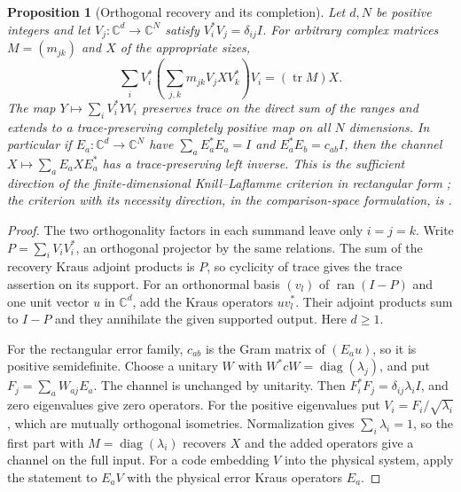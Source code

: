 \documentclass[11pt,reqno]{amsart}
\newtheorem{proposition}[theorem]{Proposition}
\theoremstyle{definition}
\theoremstyle{remark}
\numberwithin{equation}{section}
\newcommand{\C}{\mathbb{C}}
\begin{document}
\begin{proposition}[Orthogonal recovery and its completion]\label{m7:recovery}
Let $d,N$ be positive integers and let $V_j:\C^d\to\C^N$ satisfy $V_i^*V_j=\delta_{ij}I$.
For arbitrary complex matrices $M=(m_{jk})$ and $X$ of the
appropriate sizes,
\[
 \sum_i V_i^*\left(\sum_{j,k}m_{jk}V_j X V_k^*\right)V_i
    =(\operatorname{tr}M)X .
\]
The map $Y\mapsto\sum_iV_i^*YV_i$ preserves trace on the direct sum
of the ranges and extends to a trace-preserving completely positive
map on all $N$ dimensions. In particular if
$E_a:\C^d\to\C^N$ have $\sum_aE_a^*E_a=I$ and
$E_a^*E_b=c_{ab}I$, then the channel
$X\mapsto\sum_aE_a X E_a^*$ has a trace-preserving left inverse.
This is the sufficient direction of the finite-dimensional
Knill--Laflamme criterion in rectangular form
\cite{m7:KL,m7:Gottesman}; the criterion with its necessity direction, in the comparison-space formulation, is
\cite[Thm.~122]{Companion}.
\end{proposition}
\begin{proof}
The two orthogonality factors in each summand leave only $i=j=k$.
Write $P=\sum_iV_iV_i^*$, an orthogonal projector by the same
relations. The sum of the recovery Kraus adjoint products is $P$,
so cyclicity of trace gives the trace assertion on its support.
For an orthonormal basis $(v_l)$ of $\operatorname{ran}(I-P)$
and one unit vector $u$ in $\C^d$, add the Kraus operators $uv_l^*$.
Their adjoint products sum to $I-P$ and they annihilate the given
supported output. Here $d\ge1$.

For the rectangular error family, $c_{ab}$ is the Gram matrix
of $(E_a u)$, so it is positive semidefinite. Choose a unitary
$W$ with $W^*cW=\operatorname{diag}(\lambda_j)$, and put
$F_j=\sum_a W_{aj}E_a$. The channel is unchanged by unitarity.
Then $F_i^*F_j=\delta_{ij}\lambda_i I$, and zero eigenvalues
give zero operators. For the positive eigenvalues put
$V_i=F_i/\sqrt{\lambda_i}$, which are mutually orthogonal
isometries. Normalization gives $\sum_i\lambda_i=1$, so the
first part with $M=\operatorname{diag}(\lambda_i)$ recovers
$X$ and the added operators give a channel on the full input.
For a code embedding $V$ into the physical system, apply the
statement to $E_aV$ with the physical error Kraus operators $E_a$.
\end{proof}
\end{document}

